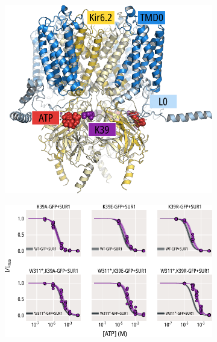 \begin{figure}[hbtp]
	\centering
	\begin{subfigure}[t]{0.45\textwidth}
		\caption{}\label{ch5fig:k39_loc}
		\centering
		\includegraphics[width=\textwidth]{k39_1.pdf}
	\end{subfigure}
	\vfill
	\begin{subfigure}[t]{0.9\textwidth}
		\caption{}\label{ch5fig:k39_atp_popfits}
		\centering
		\includegraphics[width=\textwidth]{k39_2.pdf}
	\end{subfigure}
	\caption[Functional effects of K39 mutations on ATP inhibition]{
	{\bf{}}
}
\end{figure}
